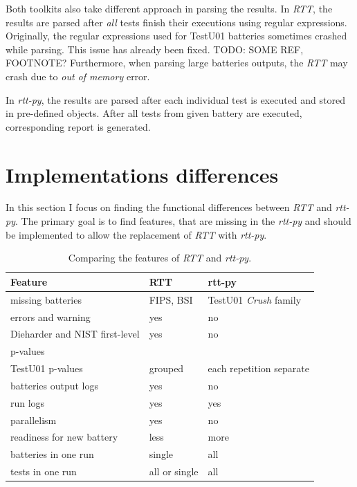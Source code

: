 \documentclass[
  digital,     %
  oneside,     %
  nosansbold,  %
  nocolorbold, %
  nolof,         %
  nolot,         %
]{fithesis4}
\begin{document}
Both toolkits also take different approach in parsing the results. In \emph{RTT}, the results are parsed after \emph{all} tests finish their executions using regular expressions. Originally, the regular expressions used for TestU01 batteries sometimes crashed while parsing. This issue has already been fixed. TODO: SOME REF, FOOTNOTE? Furthermore, when parsing large batteries outputs, the \emph{RTT} may crash due to \emph{out of memory} error.

In \emph{rtt-py}, the results are parsed after each individual test is executed and stored in pre-defined objects. After all tests from given battery are executed, corresponding report is generated.


\section{Implementations differences}
In this section I focus on finding the functional differences between \emph{RTT} and \emph{rtt-py}. The primary goal is to find features, that are missing in the \emph{rtt-py} and should be implemented to allow the replacement of \emph{RTT} with \emph{rtt-py}. 

\begin{table}
  \begin{tabularx}{\textwidth}{l|l|l}
    Feature & RTT & rtt-py \\
    \midrule
    \midrule
    missing batteries & FIPS, BSI & TestU01 \emph{Crush} family \\ %
    \midrule
    errors and warning & yes & no \\ %
    \midrule
    Dieharder and  NIST first-level& yes & no \\ %
    p-values & & \\
    \midrule
    TestU01 p-values & grouped & each repetition separate \\
    \midrule
    batteries output logs & yes & no \\ %
    \midrule
    run logs & yes & yes \\
    \midrule
    parallelism & yes & no \\ %
    \midrule
    readiness for new battery & less & more \\
    \midrule
    batteries in one run & single & all \\
    \midrule
    tests in one run & all or single & all \\
  \end{tabularx}
  \caption{Comparing the features of \emph{RTT} and \emph{rtt-py}.}
  \label{tab:comparison}
\end{table}
\end{document}

